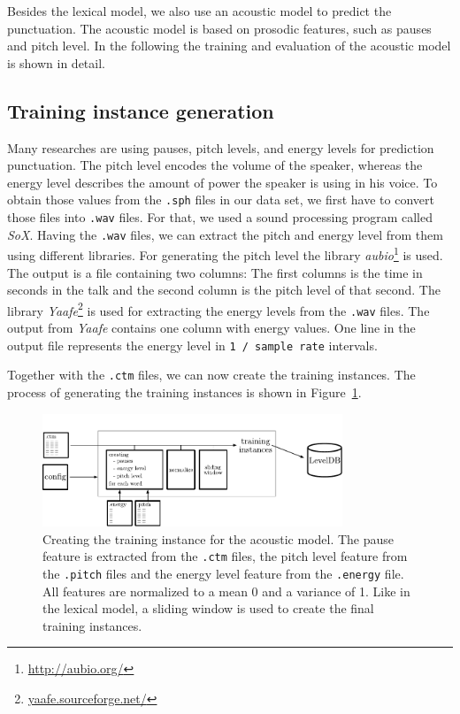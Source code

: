 Besides the lexical model, we also use an acoustic model to predict the punctuation.
The acoustic model is based on prosodic features, such as pauses and pitch level.
In the following the training and evaluation of the acoustic model is shown in detail.

\subsection{Training instance generation}

Many researches are using pauses, pitch levels, and energy levels for prediction punctuation.
The pitch level encodes the volume of the speaker, whereas the energy level describes the amount of power the speaker is using in his voice.
To obtain those values from the \texttt{.sph} files in our data set, we first have to convert those files into \texttt{.wav} files.
For that, we used a sound processing program called \emph{SoX}.
Having the \texttt{.wav} files, we can extract the pitch and energy level from them using different libraries.
For generating the pitch level the library \emph{aubio}\footnote{\url{http://aubio.org/}} is used.
The output is a file containing two columns: The first columns is the time in seconds in the talk and the second column is the pitch level of that second.
The library \emph{Yaafe}\footnote{\url{yaafe.sourceforge.net/}} is used for extracting the energy levels from the \texttt{.wav} files.
The output from \emph{Yaafe} contains one column with energy values.
One line in the output file represents the energy level in \texttt{1 / sample rate} intervals.

Together with the \texttt{.ctm} files, we can now create the training instances.
The process of generating the training instances is shown in Figure~\ref{fig:overview_acoustic}.

\begin{figure}[ht]
    \centering
    \includegraphics[width=0.8\textwidth]{img/overview_accoustic.pdf}
    \caption{Creating the training instance for the acoustic model. The pause feature is extracted from the \texttt{.ctm} files, the pitch level feature from the \texttt{.pitch} files and the energy level feature from the \texttt{.energy} file. All features are normalized to a mean 0 and a variance of 1. Like in the lexical model, a sliding window is used to create the final training instances.}
    \label{fig:overview_acoustic}
\end{figure}

